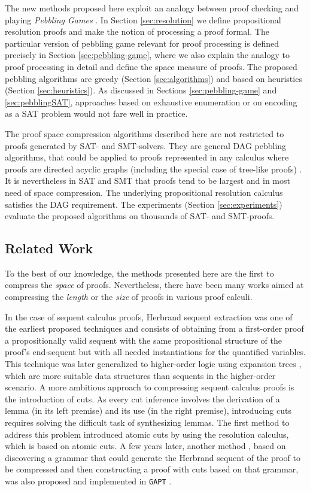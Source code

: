 The new methods proposed here exploit an analogy between proof checking and playing \emph{Pebbling Games} \cite{Kasai1979,Gilbert1980}.
In Section \ref{sec:resolution} we define propositional resolution proofs and make the notion of processing a proof formal.
The particular version of pebbling game relevant for proof processing is defined precisely in Section \ref{sec:pebbling-game}, where we also explain the analogy to proof processing in detail and define the space measure of proofs. The proposed pebbling algorithms are greedy (Section \ref{sec:algorithms}) and based on heuristics (Section \ref{sec:heuristics}). As discussed in Sections \ref{sec:pebbling-game} and \ref{sec:pebblingSAT}, approaches based on exhaustive enumeration or on encoding as a SAT problem would not fare well in practice.

The proof space compression algorithms described here are not restricted to proofs generated by SAT- and SMT-solvers. They are general DAG pebbling algorithms, that could be applied to proofs represented in any calculus where proofs are directed acyclic graphs (including the special case of tree-like proofs) \cite{APPA}. It is nevertheless in SAT and SMT that proofs tend to be largest and in most need of space compression. The underlying propositional resolution calculus satisfies the DAG requirement. The experiments (Section \ref{sec:experiments}) evaluate the proposed algorithms on thousands of SAT- and SMT-proofs.

\subsection{Related Work}

To the best of our knowledge, the methods presented here are the first to compress the \emph{space} of proofs. Nevertheless, there have been many works aimed at compressing the \emph{length} or the \emph{size} of proofs in various proof calculi. 

In the case of sequent calculus proofs, Herbrand sequent extraction \cite{B16,B12,B51} was one of the earliest proposed techniques and consists of obtaining from a first-order proof a propositionally valid sequent with the same propositional structure of the proof's end-sequent but with all needed instantiations for the quantified variables. This technique was later generalized to higher-order logic \cite{DBLP:journals/corr/LibalRR14} using expansion trees \cite{DBLP:books/daglib/0036008}, which are more suitable data structures than sequents in the higher-order scenario. A more ambitious approach to compressing sequent calculus proofs is the introduction of cuts. As every cut inference involves the derivation of a lemma (in its left premise) and its use (in the right premise), introducing cuts requires solving the difficult task of synthesizing lemmas. The first method \cite{BrunoLPAR} to address this problem introduced atomic cuts by using the resolution calculus, which is based on atomic cuts. A few years later, another method \cite{Hetzl}, based on discovering a grammar that could generate the Herbrand sequent of the proof to be compressed and then constructing a proof with cuts based on that grammar, was also proposed and implemented in \texttt{GAPT} \cite{GAPT}. 

